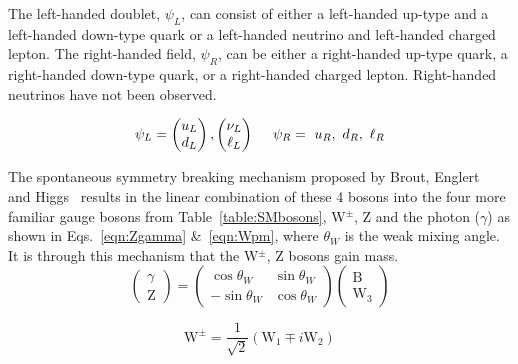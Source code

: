 The left-handed doublet, $\psi_L$, can consist of either a left-handed up-type and a left-handed down-type quark or a left-handed neutrino and left-handed charged lepton. The right-handed field, $\psi_R$, can be either a right-handed up-type quark, a right-handed down-type quark, or a right-handed charged lepton. Right-handed neutrinos have not been observed.

\begin{equation*}
\psi_L = \begin{pmatrix} u_L \\ d_L \end{pmatrix}, \begin{pmatrix} \nu_L \\ \ell_L \end{pmatrix}~~~~\psi_R=~u_R,~d_R,~\ell_R
\end{equation*}

The spontaneous symmetry breaking mechanism proposed by Brout, Englert~\cite{PhysRevLett.13.321} and Higgs~\cite{PhysRevLett.13.508} results in the linear combination of these 4 bosons into the four more familiar gauge bosons from Table~\ref{table:SMbosons}, W$^{\pm}$, Z and the photon ($\gamma$) as shown in Eqs.~\ref{eqn:Zgamma} \&~\ref{eqn:Wpm}, where $\theta_{W}$ is the weak mixing angle. It is through this mechanism that the W$^{\pm}$, Z bosons gain mass.
\begin{equation}
\label{eqn:Zgamma}
{\begin{pmatrix}
\gamma \\
\textrm{Z} 
\end{pmatrix}}
=
{\begin{pmatrix}
\cos\theta_{W} & \sin\theta_{W} \\
-\sin\theta_{W} & \cos\theta_{W} 
\end{pmatrix}}
{\begin{pmatrix}
\textrm {B} \\
\textrm{W}_{3}
\end{pmatrix}}
\end{equation}

\begin{equation}
\label{eqn:Wpm}
\textrm{W}^{\pm}=\frac{1}{\sqrt{2}}\left(\textrm{W}_{1}\mp i\textrm{W}_{2}\right)
\end{equation}


